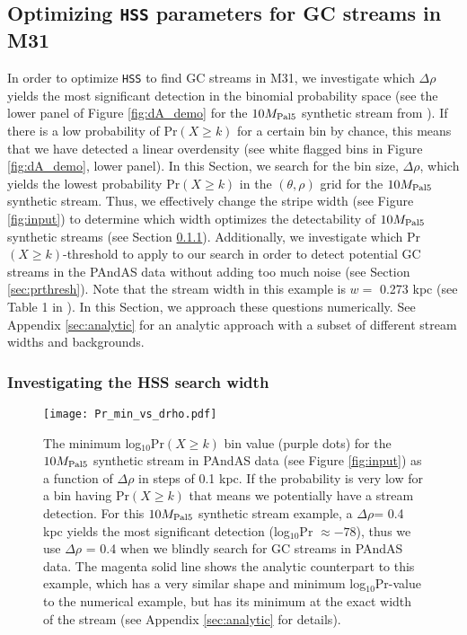 \documentclass[twocolumn]{aastex631}
\begin{document}
\subsection{Optimizing \texttt{HSS} parameters for GC streams in M31}\label{sec:optimize}
In order to optimize \texttt{HSS} to find GC streams in M31, we investigate which $\Delta \rho$ yields the most significant detection in the binomial probability space (see the lower panel of Figure \ref{fig:dA_demo} for the $10{M}_{\rm Pal 5}$ synthetic stream from ). If there is a low probability of Pr$(X \geq k)$ for a certain bin by chance, this means that we have detected a linear overdensity (see white flagged bins in Figure \ref{fig:dA_demo}, lower panel). 
In this Section, we search for the bin size, $\Delta \rho$, which yields the lowest probability Pr$(X \geq k)$ in the $(\theta,\rho)$ grid for the $10{M}_{\rm Pal 5}$ synthetic stream. Thus, we effectively change the stripe width (see Figure \ref{fig:input}) to determine which width optimizes the detectability of $10{M}_{\rm Pal 5}$ synthetic streams (see Section \ref{sec:num}).
Additionally, we investigate which Pr$(X \geq k)$-threshold to apply to our search in order to detect potential GC streams in the PAndAS data without adding too much noise (see Section \ref{sec:prthresh}).  Note that the stream width in this example is $w = $ 0.273 kpc (see Table 1 in ). In this Section, we approach these questions numerically. See Appendix \ref{sec:analytic} for an analytic approach with a subset of different stream widths and backgrounds.
 
\subsubsection{Investigating the HSS search width}\label{sec:num}
\begin{figure}
\centerline{\texttt{[image: Pr\_min\_vs\_drho.pdf]}}
\caption{The minimum log$_{10}$Pr$(X \geq k)$ bin value (purple dots) for the $10{M}_{\rm Pal 5}$ synthetic stream in PAndAS data (see Figure \ref{fig:input}) as a function of $\Delta \rho$ in steps of 0.1 kpc. If the probability is very low for a bin having Pr$(X \geq k)$ that means we potentially have a stream detection. For this $10{M}_{\rm Pal 5}$ synthetic stream example, a $\Delta \rho$= 0.4 kpc yields the most significant detection (log$_{10}$Pr $\approx -78$), thus we use $\Delta \rho$ = 0.4 when we blindly search for GC streams in PAndAS data. The  magenta solid line shows the analytic counterpart to this example, which has a very similar shape and minimum log$_{10}$Pr-value to the numerical example, but has its minimum at the exact width of the stream (see Appendix \ref{sec:analytic} for details).}
\label{fig:drho}
\end{figure}
\end{document}

